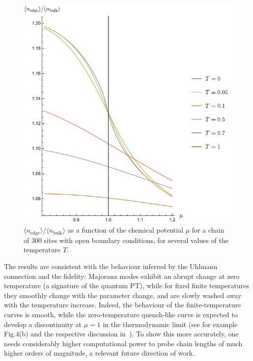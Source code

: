  
 \begin{figure}[h!]

\centering
\includegraphics[scale=0.6]{majorana_paper_plot.pdf}

\caption{$\langle n_{\text{edge}}\rangle/\langle n_{\text{bulk}}\rangle$ as a function of the chemical potential $\mu$ for a chain of 300 sites with open boundary conditions, for several values of the temperature $T$.}
\label{fig:majorana}
\end{figure}

The results are consistent with the behaviour inferred by the Uhlmann connection and the fidelity: Majorana modes exhibit an abrupt change at zero temperature (a signature of the quantum PT), while for fixed finite temperatures they smoothly change with the parameter change, and are slowly washed away with the temperature increase. Indeed, the behaviour of the finite-temperature curves is smooth, while the zero-temperature quench-like curve is expected to develop a discontinuity at $\mu = 1$ in the thermodynamic limit (see for example Fig.4(b) and the respective discussion in~\cite{qua:zur:10}). To show this more accurately, one needs considerably higher computational power to probe chain lengths of much higher orders of magnitude, a relevant future direction of work. 

